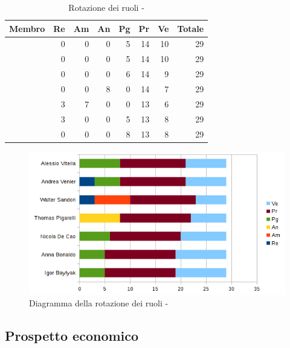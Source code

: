 \documentclass[12pt,a4paper]{article}
\begin{document}
\begin{table}[H]
	\begin{center}
		\begin{tabular}{l r r r r r r r}
			\toprule
			\textbf{Membro}	&	\textbf{Re}	&	\textbf{Am}	& \textbf{An} & \textbf{Pg} & \textbf{Pr} & \textbf{Ve} & \textbf{Totale}\\
			\midrule
			\midrule
			\IB & 0 & 0 & 0 & 5 & 14 & 10 & 29 \\
			\midrule
			\AB & 0 & 0 & 0 & 5 & 14 & 10 & 29 \\
			\midrule
			\NDC & 0 & 0 & 0 & 6 & 14 & 9 & 29 \\
			\midrule
			\TP & 0 & 0 & 8 & 0 & 14 & 7 & 29 \\
			\midrule
			\WS & 3 & 7 & 0 & 0 & 13 & 6 & 29 \\
			\midrule
			\AVE & 3 & 0 & 0 & 5 & 13 & 8 & 29 \\
			\midrule
			\AVI & 0 & 0 & 0 & 8 & 13 & 8 & 29 \\
			\bottomrule
		\end{tabular}
		\caption{Rotazione dei ruoli - \FPDC}
	\end{center}
\end{table}

\begin{center}
	\begin{figure}[H]
		\centering		\includegraphics[width=\textwidth]{diagrammaBarreProgettazioneDettaglioCodificaRotazioneRuoli.png}
		\caption{Diagramma della rotazione dei ruoli - \FPDC}
	\end{figure}
\end{center}

\subsection{Prospetto economico}
\end{document}
